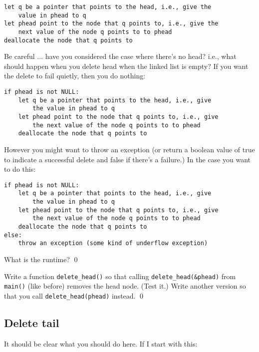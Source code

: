 \begin{Verbatim}[frame=single]
let q be a pointer that points to the head, i.e., give the
    value in phead to q
let phead point to the node that q points to, i.e., give the
    next value of the node q points to to phead
deallocate the node that q points to
\end{Verbatim}

Be careful ... have you considered the case where there's no head?
i.e., what should happen when you delete head when the linked list
is empty?
If you want the delete to fail quietly, then you do nothing:
\begin{Verbatim}[frame=single]
if phead is not NULL:
    let q be a pointer that points to the head, i.e., give
        the value in phead to q
    let phead point to the node that q points to, i.e., give
        the next value of the node q points to to phead
    deallocate the node that q points to
\end{Verbatim}
However you might want to throw an exception
(or return a boolean value of true to indicate a successful delete
and false if there's a failure.)
In the case you want to do this:
\begin{Verbatim}[frame=single]
if phead is not NULL:
    let q be a pointer that points to the head, i.e., give
        the value in phead to q
    let phead point to the node that q points to, i.e., give
        the next value of the node q points to to phead
    deallocate the node that q points to
else:
    throw an exception (some kind of underflow exception)
\end{Verbatim}


\begin{ex}
 What is the runtime?
\qed
\end{ex}

\begin{ex}
Write a function \texttt{delete\_head()} so that
calling \texttt{delete\_head(\&phead)}
from \texttt{main()} (like before)
removes the head node.
(Test it.)
Write another version so that you call
\verb!delete_head(phead)! instead.
\qed
\end{ex}


\newpage
\subsection{Delete tail}

It should be clear what you should do here.
If I start with this:



